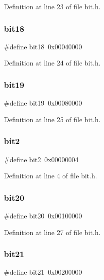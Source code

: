 Definition at line 23 of file bit.\+h.

\mbox{\label{bit_8h_aad96282909f4220f14a56efd3e774c6a}} 
\subsubsection{bit18}
{\footnotesize\ttfamily \#define bit18~0x00040000}



Definition at line 24 of file bit.\+h.

\mbox{\label{bit_8h_affb1495e3c9b9a762806c5e4f5bcfdfd}} 
\subsubsection{bit19}
{\footnotesize\ttfamily \#define bit19~0x00080000}



Definition at line 25 of file bit.\+h.

\mbox{\label{bit_8h_a1f8fe1ccd8a247049fcad2e5376b5af4}} 
\subsubsection{bit2}
{\footnotesize\ttfamily \#define bit2~0x00000004}



Definition at line 4 of file bit.\+h.

\mbox{\label{bit_8h_af366671b840eeea03e4150dad15f5eb1}} 
\subsubsection{bit20}
{\footnotesize\ttfamily \#define bit20~0x00100000}



Definition at line 27 of file bit.\+h.

\mbox{\label{bit_8h_a960fe9443cac630e9d0d76cd34a80bbc}} 
\subsubsection{bit21}
{\footnotesize\ttfamily \#define bit21~0x00200000}



